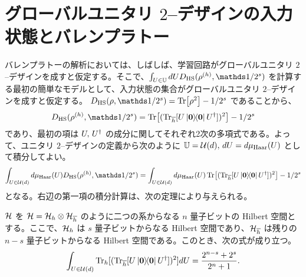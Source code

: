 \section{グローバルユニタリ $2$--デザインの入力状態とバレンプラトー}\label{sec:haar-random-input}
バレンプラトーの解析においては、しばしば、学習回路がグローバルユニタリ $2$--デザインを成すと仮定する。そこで、$\int_{U\in\bbU} dU D_{\HS} (\rho^{(h)} , \bbid/2^s)$ を計算する最初の簡単なモデルとして、入力状態の集合がグローバルユニタリ $2$--デザインを成すと仮定する。
$D_{\HS} (\rho , \bbid/2^s) = \Tr[\rho^2] - 1/2^s$ であることから、
\begin{align}
    D_{\HS}(\rho^{(h)},\bbid/2^s) = \Tr[(\Tr_{\bar{h}}[U\dyad{\bs{0}} U\dg])^2] - 1/2^s
\end{align}
であり、最初の項は $U,\,U^\dagger$ の成分に関してそれぞれ2次の多項式である。よって、ユニタリ $2$--デザインの定義から次のように $\mathbb{U} = \mathcal{U}(d),\, dU = d\mu_{\mathrm{Haar}}(U)$ として積分してよい。
\begin{align}
    \int_{U\in\calU(d)} d\mu_{\Haar}(U) D_{\HS}(\rho^{(h)},\bbid/2^s)
    = \int_{U\in\calU(d)} d\mu_{\Haar}(U) \Tr[(\Tr_{\bar{h}}[U\dyad{\bs{0}} U\dg])^2] - 1/2^s 
\end{align}
となる。右辺の第一項の積分計算は、次の定理により与えられる。

\begin{screen}
    \begin{theorem}\label{thm:dhs-haar-int}
        $\mathcal{H}$ を $\mathcal{H} = \mathcal{H}_h \otimes \mathcal{H}_{\overline{h}}$ のように二つの系からなる $n$ 量子ビットの Hilbert 空間とする。ここで、$\mathcal{H}_h$ は $s$ 量子ビットからなる Hilbert 空間であり、$\mathcal{H}_{\overline{h}}$ は残りの $n-s$ 量子ビットからなる Hilbert 空間である。このとき、次の式が成り立つ。
        \begin{align}
            \int_{U\in\calU(d)}\Tr_h[(\Tr_{\bar{h}}[U\dyad{\bs{0}}U\dg])^2] dU
            =
            \frac{2^{n-s} + 2^{s}}{2^n+1}.
        \end{align}
    \end{theorem}
\end{screen}

